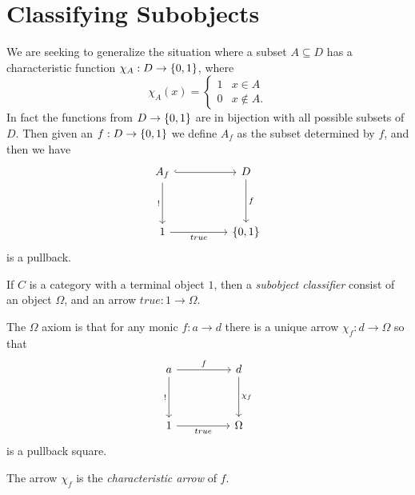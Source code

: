 \section{Classifying Subobjects}
    We are seeking to generalize the situation where a subset $A \subseteq D$ has a characteristic function $\chi_A : D \to \left\{0,1\right\}$, where 
        \[ \chi_A(x) =\begin{cases} 
              1 & x \in A \\
              0 & x \notin A.
           \end{cases}
        \]
    In fact the functions from $D \to \left\{0,1\right\}$ are in bijection with all possible subsets of $D$.
    Then given an $f : D \to \left\{0,1\right\}$ we define $A_f$ as the subset determined by $f$, and then we have
    \[\begin{tikzcd}
        {A_f} && {D} \\
        \\
        {1} && {\{0,1\}}
        \arrow[from=1-1, to=1-3, hook]
        \arrow["{!}"', from=1-1, to=3-1]
        \arrow["{f}", from=1-3, to=3-3]
        \arrow["{true}"', from=3-1, to=3-3]
    \end{tikzcd}\]
    is a pullback.

    \begin{defi} \label{subobject classifier}
        If $C$ is a category with a terminal object $1$, then a \emph{subobject classifier} consist of an object
        $\Omega$, and an arrow $true : 1 \to \Omega$.

        The $\Omega$ axiom is that for any monic $f : a \to d$ there is a unique arrow $\chi_f : d \to \Omega$ so that
        \[\begin{tikzcd}
            {a} && {d} \\
            \\
            {1} && {\Omega}
            \arrow["{f}", from=1-1, to=1-3]
            \arrow["{!}"', from=1-1, to=3-1]
            \arrow["{\chi_f}", from=1-3, to=3-3]
            \arrow["{true}"', from=3-1, to=3-3]
        \end{tikzcd}\]
        is a pullback square.

        The arrow $\chi_f$ is the \emph{characteristic arrow} of $f$.
    \end{defi}

